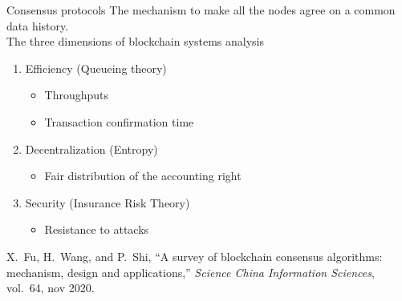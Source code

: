 \documentclass{beamer}
\begin{document}
\begin{frame}{Consensus protocols}
The mechanism to make all the nodes agree on a common data history.\\
\vspace{0.3cm}
The three dimensions of blockchain systems analysis
\begin{enumerate}
  \item Efficiency (Queueing theory)
  \begin{itemize}
    \item Throughputs
    \item Transaction confirmation time
  \end{itemize}
  \item Decentralization (Entropy)
  \begin{itemize}
    \item Fair distribution of the accounting right
  \end{itemize}
  \item Security (Insurance Risk Theory)
  \begin{itemize}
    \item Resistance to attacks
  \end{itemize}
\end{enumerate}
\footnotesize
\begin{thebibliography}{1}
X.~Fu, H.~Wang, and P.~Shi, ``A survey of blockchain consensus algorithms:
  mechanism, design and applications,'' {\em Science China Information
  Sciences}, vol.~64, nov 2020.
\end{thebibliography}
\end{frame}
\end{document}
